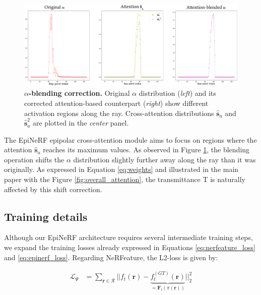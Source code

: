 \begin{figure}[h!]
    \begin{center}
  \includegraphics[width=\linewidth]{images/epinerf/SUPP_BLENDED_OVERLEAF.png}
  \caption{$\alpha$\textbf{-blending correction.} Original $\alpha$ distribution (\textit{left}) and its corrected attention-based counterpart (\textit{right}) show different activation regions along the ray. Cross-attention distributions $\hat{\textbf{s}}_{a}$ and $\hat{\textbf{s}}_{a}^{2}$ are plotted in the \textit{center} panel.}
  \label{fig:attention_construction}
  \end{center}
\end{figure}

The EpiNeRF epipolar cross-attention module aims to focus on regions where the attention $\hat{\textbf{s}}_{a}$ reaches its maximum values. As observed in Figure \ref{fig:attention_construction}, the blending operation shifts the $\alpha$ distribution slightly further away along the ray than it was originally. As expressed in Equation \ref{eq:weights} and illustrated in the main paper with the Figure \ref{fig:overall_attention}, the transmittance T is naturally affected by this shift correction. 

\subsection{Training details}
Although our EpiNeRF architecture requires several intermediate training steps, we expand the training losses already expressed in Equations \ref{eq:nerfeature_loss} and \ref{eq:epinerf_loss}. Regarding NeRFeature, the L2-loss is given by: 

\begin{equation}
\begin{split}
 \mathcal{L}_{\Psi}&= \sum_{\mathbf{r}\in\mathcal{R}} || f_{t}(\mathbf{r}) - \underbrace{f_{t}^{(GT)}(\mathbf{r})}_{=\mathbf{F}_{t}(\pi(\mathbf{r}))} ||_{2}^{2} 
\end{split}
\end{equation}

